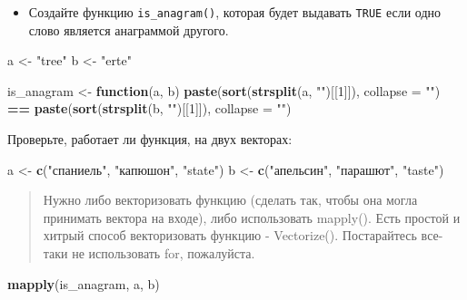 \documentclass[]{book}
\newenvironment{Shaded}{\begin{snugshade}}{\end{snugshade}}
\newcommand{\KeywordTok}[1]{\textcolor[rgb]{0.13,0.29,0.53}{\textbf{#1}}}
\newcommand{\DataTypeTok}[1]{\textcolor[rgb]{0.13,0.29,0.53}{#1}}
\newcommand{\DecValTok}[1]{\textcolor[rgb]{0.00,0.00,0.81}{#1}}
\newcommand{\StringTok}[1]{\textcolor[rgb]{0.31,0.60,0.02}{#1}}
\newcommand{\ControlFlowTok}[1]{\textcolor[rgb]{0.13,0.29,0.53}{\textbf{#1}}}
\newcommand{\OperatorTok}[1]{\textcolor[rgb]{0.81,0.36,0.00}{\textbf{#1}}}
\newcommand{\NormalTok}[1]{#1}
\providecommand{\tightlist}{%
  \setlength{\itemsep}{0pt}\setlength{\parskip}{0pt}}
\begin{document}
\begin{itemize}
\tightlist
\item
  Создайте функцию \texttt{is\_anagram()}, которая будет выдавать
  \texttt{TRUE} если одно слово является анаграммой другого.
\end{itemize}

\begin{Shaded}
\begin{Highlighting}[]
\NormalTok{a <-}\StringTok{ "tree"}
\NormalTok{b <-}\StringTok{ "erte"}

\NormalTok{is_anagram <-}\StringTok{ }\ControlFlowTok{function}\NormalTok{(a, b) }\KeywordTok{paste}\NormalTok{(}\KeywordTok{sort}\NormalTok{(}\KeywordTok{strsplit}\NormalTok{(a, }\StringTok{""}\NormalTok{)[[}\DecValTok{1}\NormalTok{]]), }\DataTypeTok{collapse =} \StringTok{""}\NormalTok{) }\OperatorTok{==}\StringTok{ }\KeywordTok{paste}\NormalTok{(}\KeywordTok{sort}\NormalTok{(}\KeywordTok{strsplit}\NormalTok{(b, }\StringTok{""}\NormalTok{)[[}\DecValTok{1}\NormalTok{]]), }\DataTypeTok{collapse =} \StringTok{""}\NormalTok{)}
\end{Highlighting}
\end{Shaded}

Проверьте, работает ли функция, на двух векторах:

\begin{Shaded}
\begin{Highlighting}[]
\NormalTok{a <-}\StringTok{ }\KeywordTok{c}\NormalTok{(}\StringTok{"спаниель"}\NormalTok{, }\StringTok{"капюшон"}\NormalTok{, }\StringTok{"state"}\NormalTok{)}
\NormalTok{b <-}\StringTok{ }\KeywordTok{c}\NormalTok{(}\StringTok{"апельсин"}\NormalTok{, }\StringTok{"парашют"}\NormalTok{, }\StringTok{"taste"}\NormalTok{)}
\end{Highlighting}
\end{Shaded}

\begin{quote}
Нужно либо векторизовать функцию (сделать так, чтобы она могла принимать
вектора на входе), либо использовать mapply(). Есть простой и хитрый
способ векторизовать функцию - Vectorize(). Постарайтесь все-таки не
использовать for, пожалуйста.
\end{quote}

\begin{Shaded}
\begin{Highlighting}[]
\KeywordTok{mapply}\NormalTok{(is_anagram, a, b)}
\end{Highlighting}
\end{Shaded}
\end{document}
